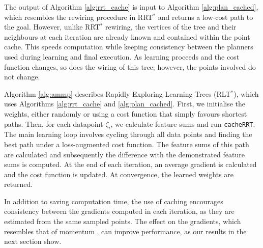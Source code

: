 \documentclass[a4paper,11pt]{report}
\begin{document}
The output of Algorithm \ref{alg:rrt_cache} is input to Algorithm \ref{alg:plan_cached}, which resembles the rewiring procedure in RRT$^*$ \cite{karaman2011sampling} and returns a low-cost path to the goal. However, unlike RRT$^*$ rewiring, the vertices of the tree and their neighbours at each iteration are already known and contained within the point cache. This speeds computation while keeping consistency between the planners used during learning and final execution. As learning proceeds and the cost function changes, so does the wiring of this tree; however, the points involved do not change. %

Algorithm \ref{alg:ammp} describes Rapidly Exploring Learning Trees (RLT$^*$), which uses Algorithms \ref{alg:rrt_cache} and \ref{alg:plan_cached}. First, we initialise the weights, either randomly or using a cost function that simply favours shortest paths. Then, for each datapoint $\zeta_i$, we calculate feature sums and run \texttt{cacheRRT}. The main learning loop involves cycling through all data points and finding the best path under a loss-augmented cost function. The feature sums of this path are calculated and subsequently the difference with the demonstrated feature sums is computed. At the end of each iteration, an average gradient is calculated and the cost function is updated. At convergence, the learned weights are returned.

In addition to saving computation time, the use of caching encourages consistency between the gradients computed in each iteration, as they are estimated from the same sampled points.  The effect on the gradients, which resembles that of momentum \cite{polyak1964some}, can improve performance, as our results in the next section show.
\end{document}
